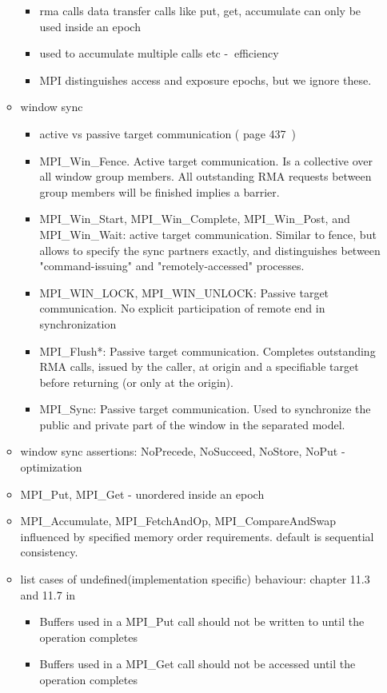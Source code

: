 \documentclass[a4paper, 10pt]{article}
\begin{document}
\begin{itemize}
\begin{itemize}
\begin{itemize}
					\item rma calls data transfer calls like put, get, accumulate can only be used inside an epoch
					\item used to accumulate multiple calls etc -$\>$ efficiency
					\item MPI distinguishes access and exposure epochs, but we ignore these.
				\end{itemize}
			\item window sync
				\begin{itemize}
					\item active vs passive target communication (\cite{mpi3} page 437~)
					\item MPI\_Win\_Fence. Active target communication. Is a collective over all window group members. All outstanding RMA requests between group members will be finished implies a barrier.
					\item MPI\_Win\_Start, MPI\_Win\_Complete, MPI\_Win\_Post, and MPI\_Win\_Wait: active target communication. Similar to fence, but allows to specify the sync partners exactly, and distinguishes between "command-issuing" and "remotely-accessed" processes.
					\item MPI\_WIN\_LOCK, MPI\_WIN\_UNLOCK: Passive target communication. No explicit participation of remote end in synchronization
					\item MPI\_Flush*: Passive target communication. Completes outstanding RMA calls, issued by the caller, at origin and a specifiable target before returning (or only at the origin).
					\item MPI\_Sync: Passive target communication. Used to synchronize the public and private part of the window in the separated model.
				\end{itemize}
			\item window sync assertions: NoPrecede, NoSucceed, NoStore, NoPut -$\>$ optimization
			\item MPI\_Put, MPI\_Get - unordered inside an epoch
			\item MPI\_Accumulate, MPI\_FetchAndOp, MPI\_CompareAndSwap influenced by specified memory order requirements. default is sequential consistency.
			\item list cases of undefined(implementation specific) behaviour: chapter 11.3 and 11.7 in \cite{mpi3}
				\begin{itemize}
					\item Buffers used in a MPI\_Put call should not be written to until the operation completes
					\item Buffers used in a MPI\_Get call should not be accessed until the operation completes

\end{itemize}
\end{itemize}
\end{itemize}
\end{document}
